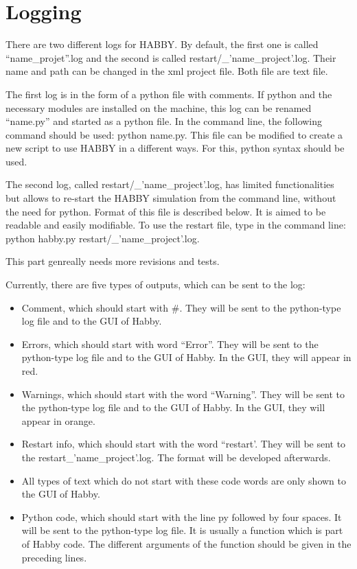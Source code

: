 \documentclass[letterpaper,10pt,english]{sphinxmanual}
\begin{document}
\section{Logging}
\label{\detokenize{index:logging}}

There are two different logs for HABBY. By default, the first one is called “name\_projet”.log and
the second is called restart/\_'name\_project'.log. Their name and path can be changed in the xml
project file. Both file are text file.

The first log is in the form of a python file with comments. If python and the necessary modules
are installed on the machine, this log can be renamed “name.py” and started as a python file.
In the command line, the following command should be used: python name.py. This file can be
modified to create a new script to use HABBY in a different ways. For this, python syntax should be used.

The second log, called restart/\_’name\_project’.log, has limited functionalities but allows to
re-start the HABBY simulation from the command line, without the need for python.
Format of this file is described below. It is aimed to be readable and easily modifiable.
To use the restart file, type in the command line: python habby.py restart/\_’name\_project’.log.

This part genreally needs more revisions and tests.


Currently, there are five types of outputs, which can be sent to the log:
\begin{itemize}
\item {} 
Comment, which should start with \#. They will be sent to the python-type log file and to the GUI of Habby.

\item {} 
Errors, which should start with word “Error”. They will be sent to the python-type log file and to the GUI of Habby. In the GUI, they will appear in red.

\item {} 
Warnings, which should start with the word “Warning”. They will be sent to the python-type log file and to the GUI of Habby. In the GUI, they will appear in orange.

\item {} 
Restart info, which should start with the word “restart’. They will be sent to the restart\_’name\_project’.log. The format will be developed afterwards.

\item {} 
All types of text which do not start with these code words are only shown to the GUI of Habby.

\item {} 
Python code, which should start with the line py followed by four spaces.  It will be sent to the python-type log file. It is usually a function which is part of Habby code. The different arguments of the function should be given in the preceding lines.

\end{itemize}
\end{document}
